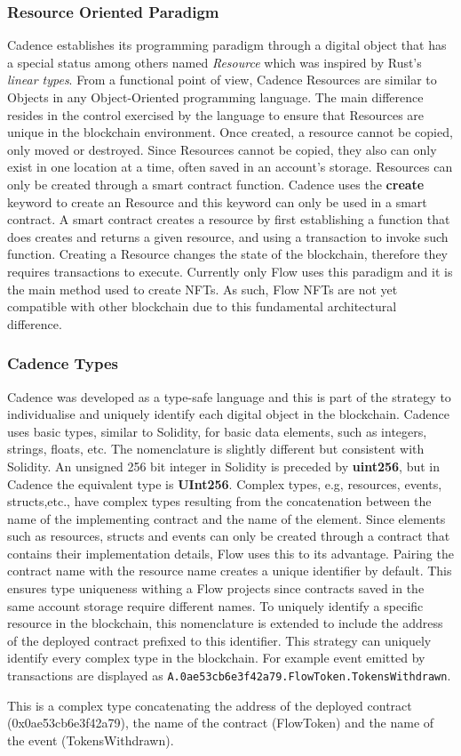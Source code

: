 \documentclass[../NFTComp_IEEE.tex]{subfiles}
\begin{document}
\subsubsection{Resource Oriented Paradigm}
Cadence establishes its programming paradigm through a digital object that has a special status among others named \textit{Resource} which was inspired by Rust's \textit{linear types}. From a functional point of view, Cadence Resources are similar to Objects in any Object-Oriented programming language. The main difference resides in the control exercised by the language to ensure that Resources are unique in the blockchain environment. Once created, a resource cannot be copied, only moved or destroyed. Since Resources cannot be copied, they also can only exist in one location at a time, often saved in an account's storage. Resources can only be created through a smart contract function. Cadence uses the \textbf{create} keyword to create an Resource and this keyword can only be used in a smart contract. A smart contract creates a resource by first establishing a function that does creates and returns a given resource, and using a transaction to invoke such function. Creating a Resource changes the state of the blockchain, therefore they requires transactions to execute. Currently only Flow uses this paradigm and it is the main method used to create NFTs. As such, Flow NFTs are not yet compatible with other blockchain due to this fundamental architectural difference.

\subsubsection{Cadence Types}
Cadence was developed as a type-safe language and this is part of the strategy to individualise and uniquely identify each digital object in the blockchain. Cadence uses basic types, similar to Solidity, for basic data elements, such as integers, strings, floats, etc. The nomenclature is slightly different but consistent with Solidity. An unsigned 256 bit integer in Solidity is preceded by \textbf{uint256}, but in Cadence the equivalent type is \textbf{UInt256}. Complex types, e.g, resources, events, structs,etc., have complex types resulting from the concatenation between the name of the implementing contract and the name of the element. Since elements such as resources, structs and events can only be created through a contract that contains their implementation details, Flow uses this to its advantage. Pairing the contract name with the resource name creates a unique identifier by default. This ensures type uniqueness withing a Flow projects since contracts saved in the same account storage require different names. To uniquely identify a specific resource in the blockchain, this nomenclature is extended to include the address of the deployed contract prefixed to this identifier. This strategy can uniquely identify every complex type in the blockchain. For example event emitted by transactions are displayed as \verb|A.0ae53cb6e3f42a79.FlowToken.TokensWithdrawn|.
\par
This is a complex type concatenating the address of the deployed contract (0x0ae53cb6e3f42a79), the name of the contract (FlowToken) and the name of the event (TokensWithdrawn).
\end{document}
